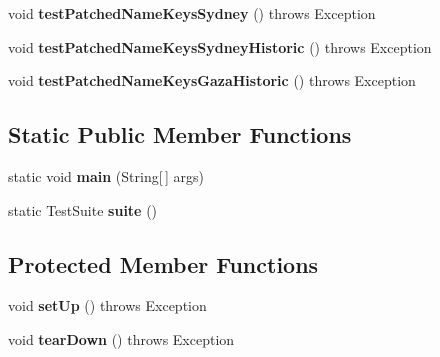 \begin{DoxyCompactItemize}
\item 
\hypertarget{classorg_1_1joda_1_1time_1_1_test_date_time_zone_ad5da394d883e44cef75266223a0957ba}{void {\bfseries test\-Patched\-Name\-Keys\-Sydney} ()  throws Exception }\label{classorg_1_1joda_1_1time_1_1_test_date_time_zone_ad5da394d883e44cef75266223a0957ba}

\item 
\hypertarget{classorg_1_1joda_1_1time_1_1_test_date_time_zone_ac9787a08425c8d0b823a06a20c1db362}{void {\bfseries test\-Patched\-Name\-Keys\-Sydney\-Historic} ()  throws Exception }\label{classorg_1_1joda_1_1time_1_1_test_date_time_zone_ac9787a08425c8d0b823a06a20c1db362}

\item 
\hypertarget{classorg_1_1joda_1_1time_1_1_test_date_time_zone_a2f27ea14562b378b8b3c10ca98d22cab}{void {\bfseries test\-Patched\-Name\-Keys\-Gaza\-Historic} ()  throws Exception }\label{classorg_1_1joda_1_1time_1_1_test_date_time_zone_a2f27ea14562b378b8b3c10ca98d22cab}

\end{DoxyCompactItemize}
\subsection*{Static Public Member Functions}
\begin{DoxyCompactItemize}
\item 
\hypertarget{classorg_1_1joda_1_1time_1_1_test_date_time_zone_af0f3fbcd9e923259ce6e9cf75a796453}{static void {\bfseries main} (String\mbox{[}$\,$\mbox{]} args)}\label{classorg_1_1joda_1_1time_1_1_test_date_time_zone_af0f3fbcd9e923259ce6e9cf75a796453}

\item 
\hypertarget{classorg_1_1joda_1_1time_1_1_test_date_time_zone_abfcfaa2ad2a483f587701a075dbec45c}{static Test\-Suite {\bfseries suite} ()}\label{classorg_1_1joda_1_1time_1_1_test_date_time_zone_abfcfaa2ad2a483f587701a075dbec45c}

\end{DoxyCompactItemize}
\subsection*{Protected Member Functions}
\begin{DoxyCompactItemize}
\item 
\hypertarget{classorg_1_1joda_1_1time_1_1_test_date_time_zone_a15bc9965a0503f07950d098b460b4607}{void {\bfseries set\-Up} ()  throws Exception }\label{classorg_1_1joda_1_1time_1_1_test_date_time_zone_a15bc9965a0503f07950d098b460b4607}

\item 
\hypertarget{classorg_1_1joda_1_1time_1_1_test_date_time_zone_aa20845bdc5716516274db9232ffcd6d4}{void {\bfseries tear\-Down} ()  throws Exception }\label{classorg_1_1joda_1_1time_1_1_test_date_time_zone_aa20845bdc5716516274db9232ffcd6d4}

\end{DoxyCompactItemize}


